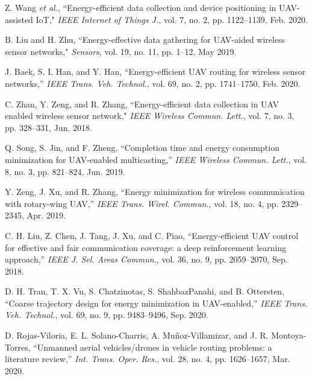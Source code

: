 \documentclass[journal]{IEEEtran}
\begin{document}
\begin{thebibliography}{1}
         Z. Wang \emph{et al.}, ``Energy-efficient data collection and device positioning in UAV-assisted IoT," \emph{IEEE Internet of Things J.}, vol. 7, no. 2, pp. 1122--1139, Feb. 2020.


          B. Liu and H. Zhu, ``Energy-effective data gathering for UAV-aided wireless sensor networks," \emph{Sensors}, vol. 19, no. 11, pp. 1--12, May 2019.


       J. Baek, S. I. Han, and Y. Han, ``Energy-efficient UAV routing for wireless sensor networks,'' \emph{IEEE Trans. Veh. Technol.}, vol. 69, no. 2, pp. 1741--1750, Feb. 2020.






       C. Zhan, Y. Zeng, and R. Zhang, ``Energy-efficient data collection in UAV enabled wireless sensor network," \emph{IEEE Wireless Commun. Lett.}, vol. 7, no. 3, pp. 328--331, Jun. 2018.


     	{Q. Song, S. Jin, and F. Zheng, ``Completion time and energy consumption minimization for UAV-enabled multicasting,'' \emph{IEEE Wireless Commun. Lett.}, vol. 8, no. 3, pp. 821--824, Jun. 2019.}


     Y. Zeng, J. Xu, and R. Zhang, ``Energy minimization for wireless communication with rotary-wing UAV,'' \emph{IEEE Trans. Wirel. Commun.}, vol. 18, no. 4, pp. 2329--2345, Apr. 2019.



      {C. H. Liu, Z. Chen, J. Tang, J. Xu, and C. Piao, ``Energy-efficient UAV control for effective and fair communication coverage: a deep reinforcement learning approach,'' \emph{IEEE J. Sel. Areas Commun.}, vol. 36, no. 9, pp. 2059--2070, Sep. 2018.}



      {D. H. Tran, T. X. Vu, S. Chatzinotas, S. ShahbazPanahi, and B. Ottersten, ``Coarse trajectory design for energy minimization in UAV-enabled,'' \emph{IEEE Trans. Veh. Technol.}, vol. 69, no. 9, pp. 9483--9496, Sep. 2020.}



      {D. Rojas-Viloria, E. L. Solano-Charris, A. Muñoz-Villamizar, and J. R. Montoya-Torres, ``Unmanned aerial vehicles/drones in vehicle routing problems: a literature review,'' \emph{Int. Trans. Oper. Res.}, vol. 28, no. 4, pp. 1626--1657, Mar. 2020.}








\end{thebibliography}
\end{document}
